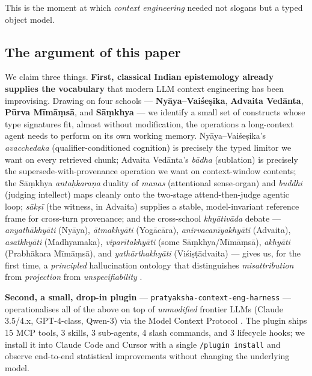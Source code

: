 This is the moment at which \emph{context engineering} needed not slogans but a typed object model.

\subsection{The argument of this paper}\label{the-argument-of-this-paper}

We claim three things. \textbf{First, classical Indian epistemology already supplies the vocabulary} that modern LLM context engineering has been improvising. Drawing on four schools --- \textbf{Nyāya--Vaiśeṣika}, \textbf{Advaita Vedānta}, \textbf{Pūrva Mīmāṃsā}, and \textbf{Sāṃkhya} --- we identify a small set of constructs whose type signatures fit, almost without modification, the operations a long-context agent needs to perform on its own working memory. Nyāya--Vaiśeṣika's \emph{avacchedaka} (qualifier-conditioned cognition) is precisely the typed limitor we want on every retrieved chunk; Advaita Vedānta's \emph{bādha} (sublation) is precisely the supersede-with-provenance operation we want on context-window contents; the Sāṃkhya \emph{antaḥkaraṇa} duality of \emph{manas} (attentional sense-organ) and \emph{buddhi} (judging intellect) maps cleanly onto the two-stage attend-then-judge agentic loop; \emph{sākṣī} (the witness, in Advaita) supplies a stable, model-invariant reference frame for cross-turn provenance; and the cross-school \emph{khyātivāda} debate --- \emph{anyathākhyāti} (Nyāya), \emph{ātmakhyāti} (Yogācāra), \emph{anirvacanīyakhyāti} (Advaita), \emph{asatkhyāti} (Madhyamaka), \emph{viparītakhyāti} (some Sāṃkhya/Mīmāṃsā), \emph{akhyāti} (Prabhākara Mīmāṃsā), and \emph{yathārthakhyāti} (Viśiṣṭādvaita) --- gives us, for the first time, a \emph{principled} hallucination ontology that distinguishes \emph{misattribution} from \emph{projection} from \emph{unspecifiability} \citep{matilal1986perception, ganeri2001philosophy, phillips2012epistemology, ram2007error}.

\textbf{Second, a small, drop-in plugin} --- \passthrough{\lstinline!pratyaksha-context-eng-harness!} --- operationalises all of the above on top of \emph{unmodified} frontier LLMs (Claude 3.5/4.x, GPT-4-class, Qwen-3) via the Model Context Protocol \citep{anthropic2025mcp}. The plugin ships 15 MCP tools, 3 skills, 3 sub-agents, 4 slash commands, and 3 lifecycle hooks; we install it into Claude Code and Cursor with a single \passthrough{\lstinline!/plugin install!} and observe end-to-end statistical improvements without changing the underlying model.

